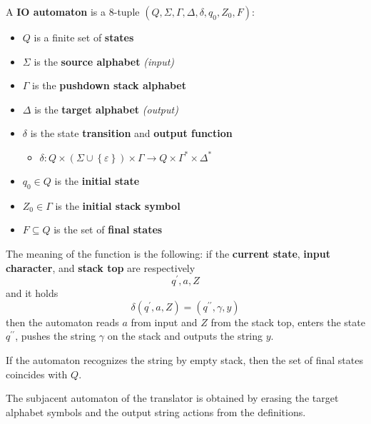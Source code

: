 \documentclass[english]{article}
\begin{document}
\begin{definition}[IO automaton]
  \label{def:pushdown-transducer}
  A \textbf{IO automaton} is  a \(8\)-tuple \(\left( Q, \Sigma, \Gamma, \Delta, \delta, q_0, Z_0, F \right)\):

  \begin{itemize}
    \item \(Q\) is a finite set of \textbf{states}
    \item \(\Sigma\) is the \textbf{source alphabet}  \textit{(input)}
    \item \(\Gamma\) is the \textbf{pushdown stack alphabet}
    \item \(\Delta\) is the \textbf{target alphabet} \textit{(output)}
    \item \(\delta\) is the state \textbf{transition} and \textbf{output function}
          \begin{itemize}
            \item \(\delta : Q \times \left( \Sigma \cup \left\{ \varepsilon \right\} \right) \times \Gamma \rightarrow Q \times \Gamma^\ast \times \Delta^\ast\)
          \end{itemize}
    \item \(q_0 \in Q\) is the \textbf{initial state}
    \item \(Z_0 \in \Gamma\) is the \textbf{initial stack symbol}
    \item \(F \subseteq Q\) is the set of \textbf{final states}
  \end{itemize}
\end{definition}

The meaning of the function is the following: if the \textbf{current state}, \textbf{input character}, and \textbf{stack top} are respectively
\[ q^\prime, a, Z \]
and it holds
\[ \delta\left(q^\prime, a, Z\right) = \left( q^{\prime\prime}, \gamma, y \right) \]
then the automaton reads \(a\) from input and \(Z\) from the stack top, enters the state \(q^{\prime\prime}\), pushes the string \(\gamma\) on the stack and outputs the string \(y\).

If the automaton recognizes the string by empty stack, then the set of final states coincides with \(Q\).

The subjacent automaton of the translator is obtained by erasing the target alphabet symbols and the output string actions from the definitions.
\end{document}
